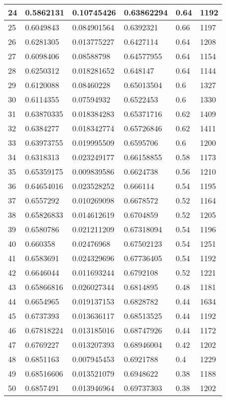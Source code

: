 \begin{longtable}{|l|l|l|l|l|l|}
24 & 0.5862131 & 0.10745426 & 0.63862294 & 0.64 & 1192 \\ \hline 
25 & 0.6049843 & 0.084901564 & 0.6392321 & 0.66 & 1197 \\ \hline 
26 & 0.6281305 & 0.013775227 & 0.6427114 & 0.64 & 1208 \\ \hline 
27 & 0.6098406 & 0.08588798 & 0.64577955 & 0.64 & 1154 \\ \hline 
28 & 0.6250312 & 0.018281652 & 0.648147 & 0.64 & 1144 \\ \hline 
29 & 0.6120088 & 0.08460228 & 0.65013504 & 0.6 & 1327 \\ \hline 
30 & 0.6114355 & 0.07594932 & 0.6522453 & 0.6 & 1330 \\ \hline 
31 & 0.63870335 & 0.018384283 & 0.65371716 & 0.62 & 1409 \\ \hline 
32 & 0.6384277 & 0.018342774 & 0.65726846 & 0.62 & 1411 \\ \hline 
33 & 0.63973755 & 0.019995509 & 0.6595706 & 0.6 & 1200 \\ \hline 
34 & 0.6318313 & 0.023249177 & 0.66158855 & 0.58 & 1173 \\ \hline 
35 & 0.65359175 & 0.009839586 & 0.6624738 & 0.56 & 1210 \\ \hline 
36 & 0.64654016 & 0.023528252 & 0.666114 & 0.54 & 1195 \\ \hline 
37 & 0.6557292 & 0.010269098 & 0.6678572 & 0.52 & 1164 \\ \hline 
38 & 0.65826833 & 0.014612619 & 0.6704859 & 0.52 & 1205 \\ \hline 
39 & 0.6580786 & 0.021211209 & 0.67318094 & 0.54 & 1196 \\ \hline 
40 & 0.660358 & 0.02476968 & 0.67502123 & 0.54 & 1251 \\ \hline 
41 & 0.6583691 & 0.024329696 & 0.67736405 & 0.54 & 1192 \\ \hline 
42 & 0.6646044 & 0.011693244 & 0.6792108 & 0.52 & 1221 \\ \hline 
43 & 0.65866816 & 0.026027344 & 0.6814895 & 0.48 & 1181 \\ \hline 
44 & 0.6654965 & 0.019137153 & 0.6828782 & 0.44 & 1634 \\ \hline 
45 & 0.6737393 & 0.013636117 & 0.68513525 & 0.44 & 1192 \\ \hline 
46 & 0.67818224 & 0.013185016 & 0.68747926 & 0.44 & 1172 \\ \hline 
47 & 0.6769227 & 0.013207393 & 0.68946004 & 0.42 & 1202 \\ \hline 
48 & 0.6851163 & 0.007945453 & 0.6921788 & 0.4 & 1229 \\ \hline 
49 & 0.68516606 & 0.013521079 & 0.6948622 & 0.38 & 1188 \\ \hline 
50 & 0.6857491 & 0.013946964 & 0.69737303 & 0.38 & 1202 \\ \hline 
\end{longtable}